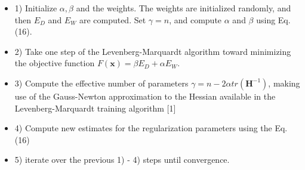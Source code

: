 \documentclass[a4paper, 12pt, english, parskip]{scrartcl}
\begin{document}
\begin{itemize}
    \item 1) Initialize $\alpha, \beta$ and the weights. The weights are initialized randomly, and then $E_D$ and $E_W$ are computed. Set $\gamma = n$, and compute $\alpha$ and $\beta$ using Eq. (16).
    
    \item 2) Take one step of the Levenberg-Marquardt algorithm toward minimizing the objective function $F(\boldsymbol{x}) = \beta E_D + \alpha E_W$.
    
    \item 3) Compute the effective number of parameters $\gamma = n - 2\alpha tr(\boldsymbol{H}^{-1})$, making use of the Gauss-Newton approximation to the Hessian available in the Levenberg-Marquardt training algorithm [1]
    
    \item 4) Compute new estimates for the regularization parameters using the Eq. (16)
    
    \item 5) iterate over the previous 1) - 4) steps until convergence.
    
\end{itemize}
\end{document}
